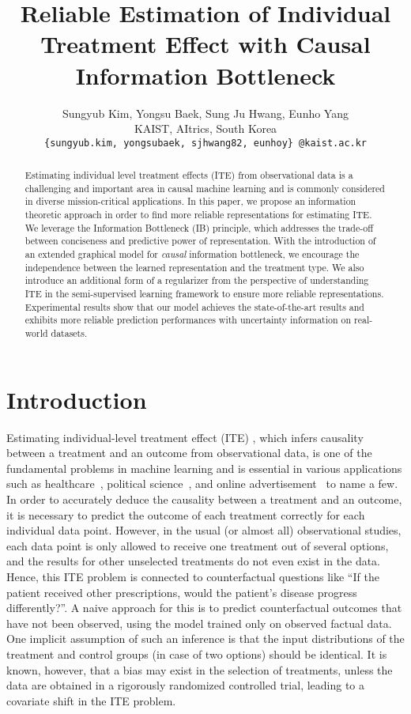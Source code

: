 \documentclass{article}
\title{Reliable Estimation of Individual Treatment Effect with Causal Information Bottleneck}
\author{Sungyub Kim, Yongsu Baek, Sung Ju Hwang, Eunho Yang\\
   KAIST, AItrics, South Korea\\
   \texttt{\{sungyub.kim, yongsubaek, sjhwang82, eunhoy\} @kaist.ac.kr} \\
}
\begin{document}
\maketitle

\begin{abstract}
  Estimating individual level treatment effects (ITE) from observational data is a challenging and important area in causal machine learning and is commonly considered in diverse mission-critical applications. In this paper, we propose an information theoretic approach in order to find more reliable representations for estimating ITE. We leverage the Information Bottleneck (IB) principle, which addresses the trade-off between conciseness and  predictive power of representation. With the introduction of an extended graphical model for \emph{causal} information bottleneck, we encourage the independence between the learned representation and the treatment type. 
  We also introduce an additional form of a regularizer from the perspective of understanding ITE in the semi-supervised learning framework to ensure more reliable representations. Experimental results show that our model achieves the state-of-the-art results and exhibits more reliable prediction performances with uncertainty information on real-world datasets.
  \end{abstract}

\section{Introduction}

Estimating individual-level treatment effect (ITE) , which infers causality between a treatment and an outcome from observational data, is one of the fundamental problems in machine learning and is essential in various applications such as healthcare~\cite{Shalit17,Glass13,Alaa17}, political science~\cite{Smith2005,LaLonde1986}, and online advertisement~\cite{Li16, Wang15} to name a few. In order to accurately deduce the causality between a treatment and an outcome, it is necessary to predict the outcome of each treatment correctly for each individual data point. However, in the usual (or almost all) observational studies, each data point is only allowed to receive one treatment out of several options, and the results for other unselected treatments do not even exist in the data. Hence, this ITE problem is connected to counterfactual questions \cite{johansson16} like ``If the patient received other prescriptions, would the patient's disease progress differently?''. A naive approach for this is to predict counterfactual outcomes that have not been observed, using the model trained only on observed factual data. One implicit assumption of such an inference is that the input distributions of the treatment and control groups (in case of two options) should be identical. It is known, however, that a bias may exist in the selection of treatments, unless the data are obtained in a rigorously randomized controlled trial, leading to a covariate shift in the ITE problem.
  
\end{document}
